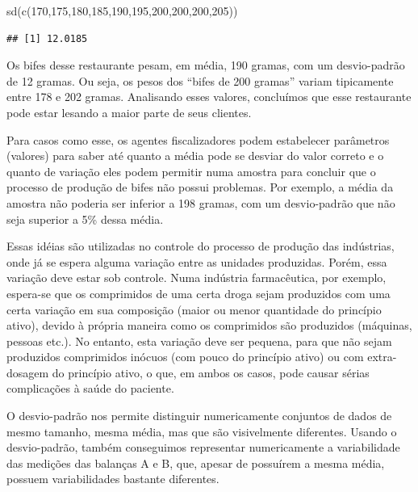 \documentclass[
]{book}
\newenvironment{Shaded}{\begin{snugshade}}{\end{snugshade}}
\newcommand{\DecValTok}[1]{\textcolor[rgb]{0.00,0.00,0.81}{#1}}
\newcommand{\FunctionTok}[1]{\textcolor[rgb]{0.00,0.00,0.00}{#1}}
\newcommand{\NormalTok}[1]{#1}
\begin{document}
\begin{Shaded}
\begin{Highlighting}[]
\FunctionTok{sd}\NormalTok{(}\FunctionTok{c}\NormalTok{(}\DecValTok{170}\NormalTok{,}\DecValTok{175}\NormalTok{,}\DecValTok{180}\NormalTok{,}\DecValTok{185}\NormalTok{,}\DecValTok{190}\NormalTok{,}\DecValTok{195}\NormalTok{,}\DecValTok{200}\NormalTok{,}\DecValTok{200}\NormalTok{,}\DecValTok{200}\NormalTok{,}\DecValTok{205}\NormalTok{))}
\end{Highlighting}
\end{Shaded}

\begin{verbatim}
## [1] 12.0185
\end{verbatim}

Os bifes desse restaurante pesam, em média, 190 gramas, com um desvio-padrão de 12 gramas. Ou seja, os pesos dos ``bifes de 200 gramas'' variam tipicamente entre 178 e 202 gramas. Analisando esses valores, concluímos que esse restaurante pode estar lesando a maior parte de seus clientes.

Para casos como esse, os agentes fiscalizadores podem estabelecer parâmetros (valores) para saber até quanto a média pode se desviar do valor correto e o quanto de variação eles podem permitir numa amostra para concluir que o processo de produção de bifes não possui problemas. Por exemplo, a média da amostra não poderia ser inferior a 198 gramas, com um desvio-padrão que não seja superior a 5\% dessa média.

Essas idéias são utilizadas no controle do processo de produção das indústrias, onde já se espera alguma variação entre as unidades produzidas. Porém, essa variação deve estar sob controle. Numa indústria farmacêutica, por exemplo, espera-se que os comprimidos de uma certa droga sejam produzidos com uma certa variação em sua composição (maior ou menor quantidade do princípio ativo), devido à própria maneira como os comprimidos são produzidos (máquinas, pessoas etc.). No entanto, esta variação deve ser pequena, para que não sejam produzidos comprimidos inócuos (com pouco do princípio ativo) ou com extra-dosagem do princípio ativo, o que, em ambos os casos, pode causar sérias complicações à saúde do paciente.

O desvio-padrão nos permite distinguir numericamente conjuntos de dados de mesmo tamanho, mesma média, mas que são visivelmente diferentes. Usando o desvio-padrão, também conseguimos representar numericamente a variabilidade das medições das balanças A e B, que, apesar de possuírem a mesma média, possuem variabilidades bastante diferentes.
\end{document}
